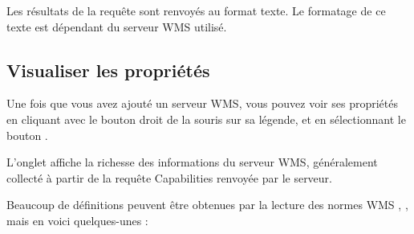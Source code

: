 Les résultats de la requête sont renvoyés au format texte. Le formatage de ce texte est dépendant du serveur WMS utilisé.

\subsection{Visualiser les propriétés}
\label{sec:ogc-wms-properties}

Une fois que vous avez ajouté un serveur WMS, vous pouvez voir ses propriétés en cliquant avec le bouton droit de la souris sur sa légende, et en sélectionnant le bouton  .

\label{sec:ogc-wms-properties-metadata}

L'onglet  affiche la richesse des informations du serveur WMS, généralement collecté à partir de la requête Capabilities renvoyée par le serveur.

Beaucoup de définitions peuvent être obtenues par la lecture des normes WMS \cite{OGCWMS010101web}, \cite{OGCWMS010300web}, mais en voici quelques-unes :

